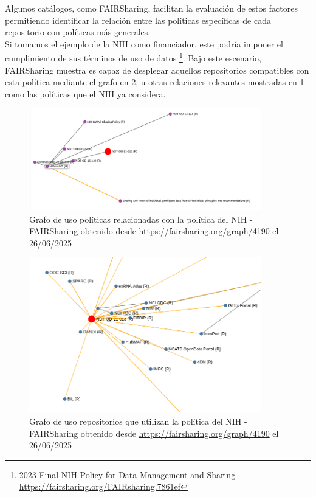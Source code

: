 \documentclass[runningheads]{llncs}
\begin{document}

Algunos catálogos, como FAIRSharing, facilitan la evaluación de estos factores permitiendo identificar la relación entre las políticas específicas de cada repositorio con políticas más generales.\\
Si tomamos el ejemplo de la NIH como financiador, este podría imponer el cumplimiento de sus términos de uso de datos \footnote{\label{nih_policy_fairsharing} 2023 Final NIH Policy for Data Management and Sharing - \url{https://fairsharing.org/FAIRsharing.7861ef}}. Bajo este escenario, FAIRSharing muestra es capaz de desplegar aquellos repositorios compatibles con esta política mediante el grafo en \ref{fairsharing_nih_policy_repo_usages}, u otras relaciones relevantes mostradas en \ref{fairsharing_nih_policy_relations} como las políticas que el NIH ya considera.

\begin{figure}[h]
    \includegraphics[width=0.9\textwidth]{FAIRSharing_NIHPol_relations.png}
    \caption{
    Grafo de uso políticas relacionadas con la política del NIH
    - FAIRSharing obtenido desde \url{https://fairsharing.org/graph/4190} el 26/06/2025
    }
    \label{fairsharing_nih_policy_relations}
\end{figure}
\begin{figure}[h]
    \includegraphics[width=0.9\textwidth]{FAIRSharing_NIHPol_Repos.png}
    \caption{
    Grafo de uso repositorios que utilizan la política del NIH
    - FAIRSharing obtenido desde \url{https://fairsharing.org/graph/4190} el 26/06/2025
    }
    \label{fairsharing_nih_policy_repo_usages}
\end{figure}
\end{document}

